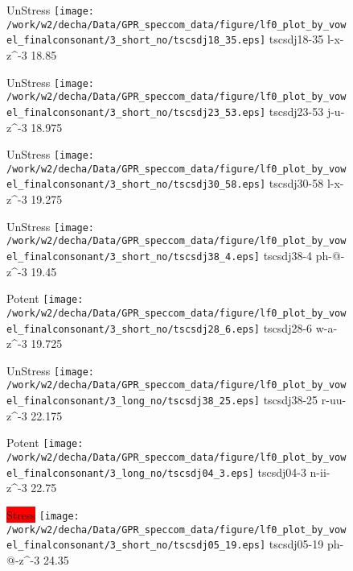 \documentclass{article}
\begin{document}
\begin{figure}[t]
\begin{minipage}[b]{.24\textwidth}
UnStress
\centering
\texttt{[image: /work/w2/decha/Data/GPR\_speccom\_data/figure/lf0\_plot\_by\_vowel\_finalconsonant/3\_short\_no/tscsdj18\_35.eps]}
tscsdj18-35 l-x-z\textasciicircum-3 18.85
\end{minipage}
\begin{minipage}[b]{.24\textwidth}
UnStress
\centering
\texttt{[image: /work/w2/decha/Data/GPR\_speccom\_data/figure/lf0\_plot\_by\_vowel\_finalconsonant/3\_short\_no/tscsdj23\_53.eps]}
tscsdj23-53 j-u-z\textasciicircum-3 18.975
\end{minipage}
\begin{minipage}[b]{.24\textwidth}
UnStress
\centering
\texttt{[image: /work/w2/decha/Data/GPR\_speccom\_data/figure/lf0\_plot\_by\_vowel\_finalconsonant/3\_short\_no/tscsdj30\_58.eps]}
tscsdj30-58 l-x-z\textasciicircum-3 19.275
\end{minipage}
\begin{minipage}[b]{.24\textwidth}
UnStress
\centering
\texttt{[image: /work/w2/decha/Data/GPR\_speccom\_data/figure/lf0\_plot\_by\_vowel\_finalconsonant/3\_short\_no/tscsdj38\_4.eps]}
tscsdj38-4 ph-@-z\textasciicircum-3 19.45
\end{minipage}
\end{figure}
\clearpage
\begin{figure}[t]
\begin{minipage}[b]{.24\textwidth}
\colorbox{Apricot}{Potent}
\centering
\texttt{[image: /work/w2/decha/Data/GPR\_speccom\_data/figure/lf0\_plot\_by\_vowel\_finalconsonant/3\_short\_no/tscsdj28\_6.eps]}
tscsdj28-6 w-a-z\textasciicircum-3 19.725
\end{minipage}
\begin{minipage}[b]{.24\textwidth}
UnStress
\centering
\texttt{[image: /work/w2/decha/Data/GPR\_speccom\_data/figure/lf0\_plot\_by\_vowel\_finalconsonant/3\_long\_no/tscsdj38\_25.eps]}
tscsdj38-25 r-uu-z\textasciicircum-3 22.175
\end{minipage}
\begin{minipage}[b]{.24\textwidth}
\colorbox{Apricot}{Potent}
\centering
\texttt{[image: /work/w2/decha/Data/GPR\_speccom\_data/figure/lf0\_plot\_by\_vowel\_finalconsonant/3\_long\_no/tscsdj04\_3.eps]}
tscsdj04-3 n-ii-z\textasciicircum-3 22.75
\end{minipage}
\begin{minipage}[b]{.24\textwidth}
\colorbox{red}{Stress}
\centering
\texttt{[image: /work/w2/decha/Data/GPR\_speccom\_data/figure/lf0\_plot\_by\_vowel\_finalconsonant/3\_short\_no/tscsdj05\_19.eps]}
tscsdj05-19 ph-@-z\textasciicircum-3 24.35
\end{minipage}
\end{figure}
\end{document}
